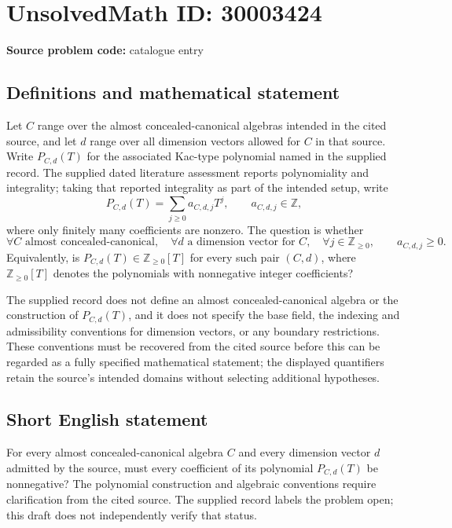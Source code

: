 \documentclass[11pt]{article}
\newcommand{\Z}{\mathbb{Z}}
\begin{document}
\section*{UnsolvedMath ID: 30003424}
\textbf{Source problem code:} catalogue entry
\subsection{Definitions and mathematical statement}
Let \(C\) range over the almost concealed-canonical algebras intended in the cited source, and let \(d\) range over all dimension vectors allowed for \(C\) in that source. Write \(P_{C,d}(T)\) for the associated Kac-type polynomial named in the supplied record. The supplied dated literature assessment reports polynomiality and integrality; taking that reported integrality as part of the intended setup, write
\[
P_{C,d}(T)=\sum_{j\geq 0}a_{C,d,j}T^j,\qquad a_{C,d,j}\in\Z,
\]
where only finitely many coefficients are nonzero. The question is whether
\[
\forall C\text{ almost concealed-canonical},\quad
\forall d\text{ a dimension vector for }C,\quad
\forall j\in\Z_{\geq 0},\qquad a_{C,d,j}\geq 0.
\]
Equivalently, is \(P_{C,d}(T)\in\Z_{\geq 0}[T]\) for every such pair \((C,d)\), where \(\Z_{\geq 0}[T]\) denotes the polynomials with nonnegative integer coefficients?

The supplied record does not define an almost concealed-canonical algebra or the construction of \(P_{C,d}(T)\), and it does not specify the base field, the indexing and admissibility conventions for dimension vectors, or any boundary restrictions. These conventions must be recovered from the cited source before this can be regarded as a fully specified mathematical statement; the displayed quantifiers retain the source's intended domains without selecting additional hypotheses.
\subsection{Short English statement}
For every almost concealed-canonical algebra \(C\) and every dimension vector \(d\) admitted by the source, must every coefficient of its polynomial \(P_{C,d}(T)\) be nonnegative? The polynomial construction and algebraic conventions require clarification from the cited source. The supplied record labels the problem open; this draft does not independently verify that status.
\end{document}
